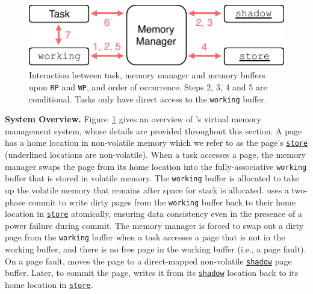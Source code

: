 \begin{figure}
    \centering
    \includegraphics[width=\columnwidth]{figures/mem-man.pdf}
    \caption{Interaction between task, memory manager and memory buffers upon \texttt{RP} and \texttt{WP},
    and order of occurrence. Steps 2, 3, 4 and 5 are conditional. Tasks only have direct access to the
    \texttt{working} buffer.}
    \label{figure:mem-man}
\end{figure}


\textbf{System Overview.}
Figure~\ref{figure:mem-man} gives an overview of \sys's virtual memory management system,
whose details are provided throughout this section.
A page has a home location in non-volatile memory which we refer to as the page's
\texttt{\underline{store}} (underlined locations are non-volatile).  When a
task accesses a page, the memory manager swaps the page from its home location
into the fully\hyp{}associative \texttt{working} buffer that is stored in
volatile memory.  The \texttt{working} buffer is allocated to take up the
volatile memory that remains after space for stack is allocated.
%
\sys uses a two-phase commit to write dirty pages from the \texttt{working}
buffer back to their home location in \texttt{\underline{store}} atomically,
ensuring data consistency even in the presence of a power failure during commit.
%
The memory manager is forced to swap out a dirty page from the \texttt{working} buffer
when a task accesses a page that is not in the working buffer, and there is no
free page in the working buffer (i.e., a page fault). On a page fault, \sys
moves the page to a direct\hyp{}mapped non-volatile \texttt{\underline{shadow}}
page buffer. Later, to commit the page, \sys writes it from its
\texttt{\underline{shadow}} location back to its home location in
\texttt{\underline{store}}.
%
%

